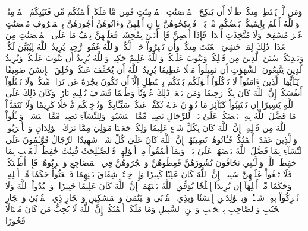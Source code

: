 وَمَن لَّمۡ يَسۡتَطِعۡ مِنكُمۡ طَوۡلًا أَن يَنكِحَ ٱلۡمُحۡصَنَٰتِ ٱلۡمُؤۡمِنَٰتِ فَمِن مَّا مَلَكَتۡ أَيۡمَٰنُكُم مِّن فَتَيَٰتِكُمُ ٱلۡمُؤۡمِنَٰتِۚ وَٱللَّهُ أَعۡلَمُ بِإِيمَٰنِكُمۚ بَعۡضُكُم مِّنۢ بَعۡضٖۚ فَٱنكِحُوهُنَّ بِإِذۡنِ أَهۡلِهِنَّ وَءَاتُوهُنَّ أُجُورَهُنَّ بِٱلۡمَعۡرُوفِ مُحۡصَنَٰتٍ غَيۡرَ مُسَٰفِحَٰتٖ وَلَا مُتَّخِذَٰتِ أَخۡدَانٖۚ فَإِذَآ أُحۡصِنَّ فَإِنۡ أَتَيۡنَ بِفَٰحِشَةٖ فَعَلَيۡهِنَّ نِصۡفُ مَا عَلَى ٱلۡمُحۡصَنَٰتِ مِنَ ٱلۡعَذَابِۚ ذَٰلِكَ لِمَنۡ خَشِيَ ٱلۡعَنَتَ مِنكُمۡۚ وَأَن تَصۡبِرُواْ خَيۡرٞ لَّكُمۡۗ وَٱللَّهُ غَفُورٞ رَّحِيمٞ
يُرِيدُ ٱللَّهُ لِيُبَيِّنَ لَكُمۡ وَيَهۡدِيَكُمۡ سُنَنَ ٱلَّذِينَ مِن قَبۡلِكُمۡ وَيَتُوبَ عَلَيۡكُمۡۗ وَٱللَّهُ عَلِيمٌ حَكِيمٞ
وَٱللَّهُ يُرِيدُ أَن يَتُوبَ عَلَيۡكُمۡ وَيُرِيدُ ٱلَّذِينَ يَتَّبِعُونَ ٱلشَّهَوَٰتِ أَن تَمِيلُواْ مَيۡلًا عَظِيمٗا
يُرِيدُ ٱللَّهُ أَن يُخَفِّفَ عَنكُمۡۚ وَخُلِقَ ٱلۡإِنسَٰنُ ضَعِيفٗا
يَـٰٓأَيُّهَا ٱلَّذِينَ ءَامَنُواْ لَا تَأۡكُلُوٓاْ أَمۡوَٰلَكُم بَيۡنَكُم بِٱلۡبَٰطِلِ إِلَّآ أَن تَكُونَ تِجَٰرَةً عَن تَرَاضٖ مِّنكُمۡۚ وَلَا تَقۡتُلُوٓاْ أَنفُسَكُمۡۚ إِنَّ ٱللَّهَ كَانَ بِكُمۡ رَحِيمٗا
وَمَن يَفۡعَلۡ ذَٰلِكَ عُدۡوَٰنٗا وَظُلۡمٗا فَسَوۡفَ نُصۡلِيهِ نَارٗاۚ وَكَانَ ذَٰلِكَ عَلَى ٱللَّهِ يَسِيرًا
إِن تَجۡتَنِبُواْ كَبَآئِرَ مَا تُنۡهَوۡنَ عَنۡهُ نُكَفِّرۡ عَنكُمۡ سَيِّـَٔاتِكُمۡ وَنُدۡخِلۡكُم مُّدۡخَلٗا كَرِيمٗا
وَلَا تَتَمَنَّوۡاْ مَا فَضَّلَ ٱللَّهُ بِهِۦ بَعۡضَكُمۡ عَلَىٰ بَعۡضٖۚ لِّلرِّجَالِ نَصِيبٞ مِّمَّا ٱكۡتَسَبُواْۖ وَلِلنِّسَآءِ نَصِيبٞ مِّمَّا ٱكۡتَسَبۡنَۚ وَسۡـَٔلُواْ ٱللَّهَ مِن فَضۡلِهِۦٓۚ إِنَّ ٱللَّهَ كَانَ بِكُلِّ شَيۡءٍ عَلِيمٗا
وَلِكُلّٖ جَعَلۡنَا مَوَٰلِيَ مِمَّا تَرَكَ ٱلۡوَٰلِدَانِ وَٱلۡأَقۡرَبُونَۚ وَٱلَّذِينَ عَقَدَتۡ أَيۡمَٰنُكُمۡ فَـَٔاتُوهُمۡ نَصِيبَهُمۡۚ إِنَّ ٱللَّهَ كَانَ عَلَىٰ كُلِّ شَيۡءٖ شَهِيدًا
ٱلرِّجَالُ قَوَّـٰمُونَ عَلَى ٱلنِّسَآءِ بِمَا فَضَّلَ ٱللَّهُ بَعۡضَهُمۡ عَلَىٰ بَعۡضٖ وَبِمَآ أَنفَقُواْ مِنۡ أَمۡوَٰلِهِمۡۚ فَٱلصَّـٰلِحَٰتُ قَٰنِتَٰتٌ حَٰفِظَٰتٞ لِّلۡغَيۡبِ بِمَا حَفِظَ ٱللَّهُۚ وَٱلَّـٰتِي تَخَافُونَ نُشُوزَهُنَّ فَعِظُوهُنَّ وَٱهۡجُرُوهُنَّ فِي ٱلۡمَضَاجِعِ وَٱضۡرِبُوهُنَّۖ فَإِنۡ أَطَعۡنَكُمۡ فَلَا تَبۡغُواْ عَلَيۡهِنَّ سَبِيلًاۗ إِنَّ ٱللَّهَ كَانَ عَلِيّٗا كَبِيرٗا
وَإِنۡ خِفۡتُمۡ شِقَاقَ بَيۡنِهِمَا فَٱبۡعَثُواْ حَكَمٗا مِّنۡ أَهۡلِهِۦ وَحَكَمٗا مِّنۡ أَهۡلِهَآ إِن يُرِيدَآ إِصۡلَٰحٗا يُوَفِّقِ ٱللَّهُ بَيۡنَهُمَآۗ إِنَّ ٱللَّهَ كَانَ عَلِيمًا خَبِيرٗا
۞وَٱعۡبُدُواْ ٱللَّهَ وَلَا تُشۡرِكُواْ بِهِۦ شَيۡـٔٗاۖ وَبِٱلۡوَٰلِدَيۡنِ إِحۡسَٰنٗا وَبِذِي ٱلۡقُرۡبَىٰ وَٱلۡيَتَٰمَىٰ وَٱلۡمَسَٰكِينِ وَٱلۡجَارِ ذِي ٱلۡقُرۡبَىٰ وَٱلۡجَارِ ٱلۡجُنُبِ وَٱلصَّاحِبِ بِٱلۡجَنۢبِ وَٱبۡنِ ٱلسَّبِيلِ وَمَا مَلَكَتۡ أَيۡمَٰنُكُمۡۗ إِنَّ ٱللَّهَ لَا يُحِبُّ مَن كَانَ مُخۡتَالٗا فَخُورًا
